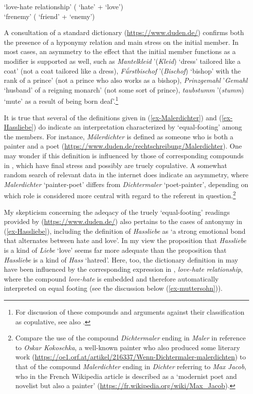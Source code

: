 \documentclass[output=paper
 ,nobabel
 ,draftmode
 ,colorlinks, citecolor=brown
]{langscibook}
\begin{document}
\ex\label{ex-Hassliebe}
 `love-hate relationship' ( `hate' +  `love') \\
 `frenemy' ( `friend' +  `enemy')

\zl

\noindent
A consultation of a standard dictionary (\url{https://www.duden.de/}) confirms both the presence of
a hyponymy relation and main stress on the initial member. In most cases, an asymmetry to the effect
that the initial member functions as a modifier is supported as well, such as \emph{Mantelkleid}
'(\emph{Kleid}) `dress' tailored like a coat' (not a coat tailored like a dress), \emph{Fǘrstbischof} '(\emph{Bischof}) `bishop' with the rank of a prince' (not a prince who also works as a bishop),
\emph{Prinzgemahl} '\emph{Gemahl} `husband' of a reigning monarch' (not some sort of prince), \emph{taubstumm} '(\emph{stumm}) `mute' as a result of being born deaf'.\footnote{For discussion of these compounds and arguments against their classification as copulative, see also .}

It is true that several of the definitions given in (\ref{ex-Malerdichter}) and (\ref{ex-Hassliebe}) do indicate an interpretation characterized by `equal-footing' among the members. For instance, \emph{Málerdichter} is defined as someone who is both a painter and a poet (\url{https://www.duden.de/rechtschreibung/Malerdichter}). One may wonder if this definition is influenced by those of corresponding compounds in , which have final stress and possibly are truely copulative. A somewhat random search of relevant data in the internet does indicate an asymmetry, where \emph{Malerdichter} `painter-poet' differs from \emph{Dichtermaler} `poet-painter', depending on which role is considered more central with regard to the referent in question.\footnote{Compare the use of the compound \emph{Dichtermaler} ending in \emph{Maler} in reference to \emph{Oskar Kokoschka}, a well-known painter who also produced some literary work (\url{https://oe1.orf.at/artikel/216337/Wenn-Dichtermaler-malerdichten}) to that of the compound \emph{Malerdichter} ending in \emph{Dichter} referring to \emph{Max Jacob}, who in the French Wikipedia article is described as a `modernist poet and novelist but also a painter'  (\url{https://fr.wikipedia.org/wiki/Max_Jacob}).} 

\largerpage
My skepticism concerning the adeqacy of the truely `equal-footing' readings provided by
(\url{https://www.duden.de/}) also pertains to the cases of antonymy in (\ref{ex-Hassliebe}),
including the definition of \emph{Hassliebe} as `a strong emotional bond that alternates between
hate and love'. In my view the proposition that \emph{Hassliebe} is a kind of \emph{Liebe} `love'
seems far more adequate than the proposition that \emph{Hassliebe} is a kind of \emph{Hass}
`hatred'. Here, too, the dictionary definition in  may have been influenced by the
corresponding expression in , \emph{love-hate relationship}, where the compound
\emph{love-hate} is embedded and therefore automatically interpreted on equal footing (see the
discussion below (\ref{ex-muttersohn})).
\end{document}
